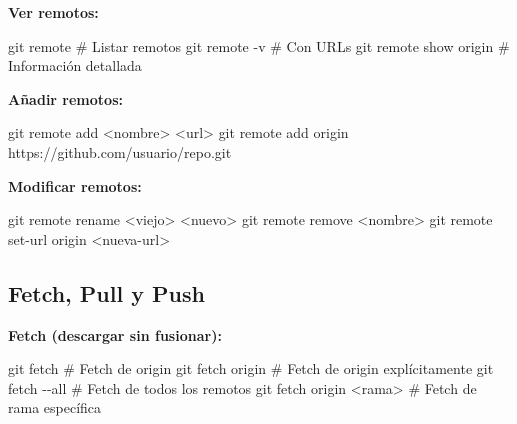 \documentclass[
  doc,
  floatsintext,
  longtable,
  a4paper,
  nolmodern,
  notxfonts,
  notimes,
  12pt,
  colorlinks=true,linkcolor=blue,citecolor=blue,urlcolor=blue]{apa7}
\newenvironment{Shaded}{\begin{snugshade}}{\end{snugshade}}
\newcommand{\AttributeTok}[1]{\textcolor[rgb]{0.40,0.45,0.13}{#1}}
\newcommand{\CommentTok}[1]{\textcolor[rgb]{0.37,0.37,0.37}{#1}}
\newcommand{\FunctionTok}[1]{\textcolor[rgb]{0.28,0.35,0.67}{#1}}
\newcommand{\NormalTok}[1]{\textcolor[rgb]{0.00,0.23,0.31}{#1}}
\newcommand{\OperatorTok}[1]{\textcolor[rgb]{0.37,0.37,0.37}{#1}}
\begin{document}
\textbf{Ver remotos:}

\begin{Shaded}
\begin{Highlighting}[]
\FunctionTok{git}\NormalTok{ remote                 }\CommentTok{\# Listar remotos}
\FunctionTok{git}\NormalTok{ remote }\AttributeTok{{-}v}              \CommentTok{\# Con URLs}
\FunctionTok{git}\NormalTok{ remote show origin     }\CommentTok{\# Información detallada}
\end{Highlighting}
\end{Shaded}

\textbf{Añadir remotos:}

\begin{Shaded}
\begin{Highlighting}[]
\FunctionTok{git}\NormalTok{ remote add }\OperatorTok{\textless{}}\NormalTok{nombre}\OperatorTok{\textgreater{}} \OperatorTok{\textless{}}\NormalTok{url}\OperatorTok{\textgreater{}}
\FunctionTok{git}\NormalTok{ remote add origin https://github.com/usuario/repo.git}
\end{Highlighting}
\end{Shaded}

\textbf{Modificar remotos:}

\begin{Shaded}
\begin{Highlighting}[]
\FunctionTok{git}\NormalTok{ remote rename }\OperatorTok{\textless{}}\NormalTok{viejo}\OperatorTok{\textgreater{}} \OperatorTok{\textless{}}\NormalTok{nuevo}\OperatorTok{\textgreater{}}
\FunctionTok{git}\NormalTok{ remote remove }\OperatorTok{\textless{}}\NormalTok{nombre}\OperatorTok{\textgreater{}}
\FunctionTok{git}\NormalTok{ remote set{-}url origin }\OperatorTok{\textless{}}\NormalTok{nueva{-}url}\OperatorTok{\textgreater{}}
\end{Highlighting}
\end{Shaded}

\subsection{Fetch, Pull y Push}\label{fetch-pull-y-push}

\textbf{Fetch (descargar sin fusionar):}

\begin{Shaded}
\begin{Highlighting}[]
\FunctionTok{git}\NormalTok{ fetch                  }\CommentTok{\# Fetch de origin}
\FunctionTok{git}\NormalTok{ fetch origin           }\CommentTok{\# Fetch de origin explícitamente}
\FunctionTok{git}\NormalTok{ fetch }\AttributeTok{{-}{-}all}            \CommentTok{\# Fetch de todos los remotos}
\FunctionTok{git}\NormalTok{ fetch origin }\OperatorTok{\textless{}}\NormalTok{rama}\OperatorTok{\textgreater{}}    \CommentTok{\# Fetch de rama específica}
\end{Highlighting}
\end{Shaded}
\end{document}
